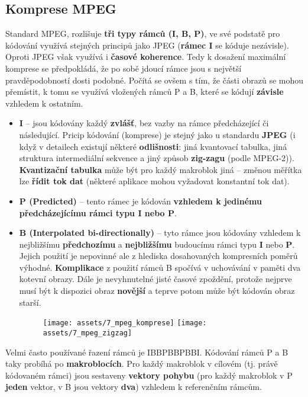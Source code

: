 \subsection{Komprese MPEG}
Standard MPEG, rozlišuje \textbf{tři typy rámců (I, B, P)},  ve své podstatě pro kódování využívá stejných principů jako JPEG (\textbf{rámec I} se kóduje nezávisle). Oproti JPEG však využívá i \textbf{časové koherence}. Tedy k dosažení maximální komprese se předpokládá, že po sobě jdoucí rámce jsou s největší pravděpodobností dosti podobné. Počítá se ovšem s tím, že části obrazů se mohou přemístit, k tomu se využívá vložených rámců P a B, které se kódují \textbf{závisle} vzhledem k ostatním.
\begin{itemize}
    \item \textbf{I} -- jsou kódovány každý \textbf{zvlášť}, bez vazby na rámce předcházející či následující. Pricip kódování (komprese) je stejný jako u standardu \textbf{JPEG} (i když v detailech existují některé \textbf{odlišnosti}: jiná kvantovací tabulka, jiná struktura intermediální sekvence a jiný způsob \textbf{zig-zagu} (podle MPEG-2)). \textbf{Kvantizační tabulka} může být pro každý makroblok jiná -- změnou měřítka lze \textbf{řídit tok dat} (některé aplikace mohou vyžadovat konstantní tok dat).
    \item \textbf{P (Predicted)} -- tento rámec je kódován \textbf{vzhledem k jedinému předcházejícímu rámci typu I nebo P}.
    \item \textbf{B (Interpolated bi-directionally)} -- tyto rámce jsou kódovány vzhledem k nejbližšímu \textbf{předchozímu} a \textbf{nejbližšímu} budoucímu rámci typu \textbf{I} nebo \textbf{P}. Jejich použití je nepovinné ale z hlediska dosahovaných kompresních poměrů výhodné. \textbf{Komplikace} z použití rámců B spočívá v uchovávání v paměti dva kotevní obrazy. Dále je nevyhnutelné jisté časové zpoždění, protože nejprve musí být k dispozici obraz \textbf{novější} a teprve potom může být kódován obraz starší.
          \begin{figure}[H]
              \centering
              \texttt{[image: assets/7\_mpeg\_komprese]}
              \texttt{[image: assets/7\_mpeg\_zigzag]}
          \end{figure}
\end{itemize}

Velmi často používané řazení rámců je IBBPBBPBBI. Kódování rámců P a B taky probíhá po \textbf{makroblocích}. Pro každý makroblok v cílovém (tj. právě kódovaném rámci) jsou sestaveny \textbf{vektory pohybu} (pro každý makroblok v P \textbf{jeden} vektor, v B jsou vektory \textbf{dva}) vzhledem k referenčním rámcům.

